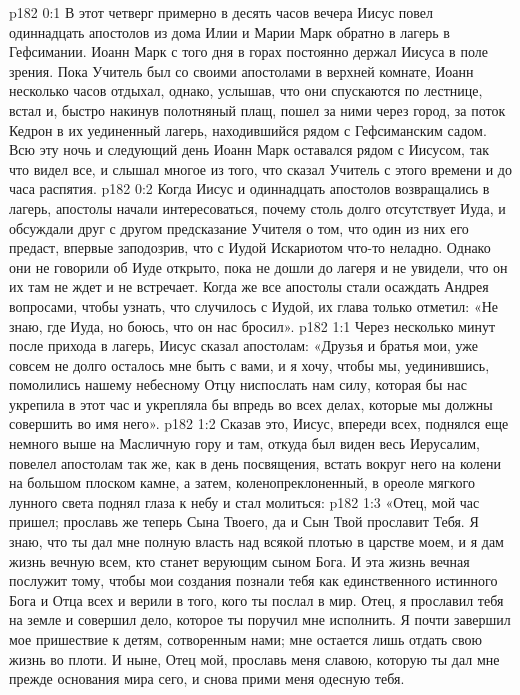 \vs p182 0:1 В этот четверг примерно в десять часов вечера Иисус повел одиннадцать апостолов из дома Илии и Марии Марк обратно в лагерь в Гефсимании. Иоанн Марк с того дня в горах постоянно держал Иисуса в поле зрения. Пока Учитель был со своими апостолами в верхней комнате, Иоанн несколько часов отдыхал, однако, услышав, что они спускаются по лестнице, встал и, быстро накинув полотняный плащ, пошел за ними через город, за поток Кедрон в их уединенный лагерь, находившийся рядом с Гефсиманским садом. Всю эту ночь и следующий день Иоанн Марк оставался рядом с Иисусом, так что видел все, и слышал многое из того, что сказал Учитель с этого времени и до часа распятия.
\vs p182 0:2 Когда Иисус и одиннадцать апостолов возвращались в лагерь, апостолы начали интересоваться, почему столь долго отсутствует Иуда, и обсуждали друг с другом предсказание Учителя о том, что один из них его предаст, впервые заподозрив, что с Иудой Искариотом что\hyp{}то неладно. Однако они не говорили об Иуде открыто, пока не дошли до лагеря и не увидели, что он их там не ждет и не встречает. Когда же все апостолы стали осаждать Андрея вопросами, чтобы узнать, что случилось с Иудой, их глава только отметил: «Не знаю, где Иуда, но боюсь, что он нас бросил».
\vs p182 1:1 Через несколько минут после прихода в лагерь, Иисус сказал апостолам: «Друзья и братья мои, уже совсем не долго осталось мне быть с вами, и я хочу, чтобы мы, уединившись, помолились нашему небесному Отцу ниспослать нам силу, которая бы нас укрепила в этот час и укрепляла бы впредь во всех делах, которые мы должны совершить во имя него».
\vs p182 1:2 Сказав это, Иисус, впереди всех, поднялся еще немного выше на Масличную гору и там, откуда был виден весь Иерусалим, повелел апостолам так же, как в день посвящения, встать вокруг него на колени на большом плоском камне, а затем, коленопреклоненный, в ореоле мягкого лунного света поднял глаза к небу и стал молиться:
\vs p182 1:3 «Отец, мой час пришел; прославь же теперь Сына Твоего, да и Сын Твой прославит Тебя. Я знаю, что ты дал мне полную власть над всякой плотью в царстве моем, и я дам жизнь вечную всем, кто станет верующим сыном Бога. И эта жизнь вечная послужит тому, чтобы мои создания познали тебя как единственного истинного Бога и Отца всех и верили в того, кого ты послал в мир. Отец, я прославил тебя на земле и совершил дело, которое ты поручил мне исполнить. Я почти завершил мое пришествие к детям, сотворенным нами; мне остается лишь отдать свою жизнь во плоти. И ныне, Отец мой, прославь меня славою, которую ты дал мне прежде основания мира сего, и снова прими меня одесную тебя.
